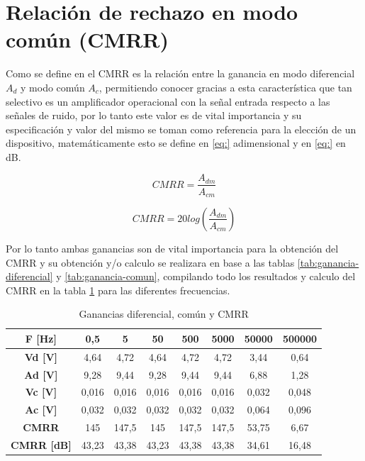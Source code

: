 \section{Relación de rechazo en modo común (CMRR)}

Como se define en \cite{horenstein2000circuitos} el CMRR es la relación entre la ganancia en modo diferencial $A_d$ y  modo común $A_c$, permitiendo conocer gracias a esta característica que tan selectivo es un amplificador operacional con la señal entrada respecto a las señales de ruido, por lo tanto este valor es de vital importancia y su especificación y valor del mismo se toman como referencia para la elección de un dispositivo, matemáticamente esto se define en \ref{eq:} adimensional y en \ref{eq:} en dB.

\begin{equation}
	CMRR = \frac{A_{dm}}{A_{cm}}
	\label{eq:cmrr-adimensional}
\end{equation}

\begin{equation}
	CMRR = 20log(\frac{A_{dm}}{A_{cm}})
	\label{eq:cmrr-db}
\end{equation}

Por lo tanto ambas ganancias son de vital importancia para la obtención del CMRR y su obtención y/o calculo se realizara en base a las tablas \ref{tab:ganancia-diferencial} y \ref{tab:ganancia-comun}, compilando todo los resultados y calculo del CMRR en la tabla \ref{tab:cmrr} para las diferentes frecuencias.

\begin{table}[]
	\centering
	\begin{tabular}{|c|c|c|c|c|c|c|c|}
		\hline
		\textbf{F {[}Hz{]}}                          & \textbf{0,5} & \textbf{5} & \textbf{50} & \textbf{500} & \textbf{5000} & \textbf{50000} & \textbf{500000} \\ \hline
		\textbf{Vd {[}V{]}}                          & 4,64         & 4,72       & 4,64        & 4,72         & 4,72          & 3,44           & 0,64            \\ \hline
		\textbf{Ad {[}V{]}}                          & 9,28         & 9,44       & 9,28        & 9,44         & 9,44          & 6,88           & 1,28            \\ \hline
		\textbf{Vc {[}V{]}}                          & 0,016        & 0,016      & 0,016       & 0,016        & 0,016         & 0,032          & 0,048           \\ \hline
		\textbf{Ac {[}V{]}}                          & 0,032        & 0,032      & 0,032       & 0,032        & 0,032         & 0,064          & 0,096           \\ \hline
		\textbf{CMRR}                                & 145          & 147,5      & 145         & 147,5        & 147,5         & 53,75          & 6,67            \\ \hline
		\multicolumn{1}{|l|}{\textbf{CMRR {[}dB{]}}} & 43,23        & 43,38      & 43,23       & 43,38        & 43,38         & 34,61          & 16,48           \\ \hline
	\end{tabular}
	\caption{Ganancias diferencial, común y CMRR}
	\label{tab:cmrr}
\end{table}

